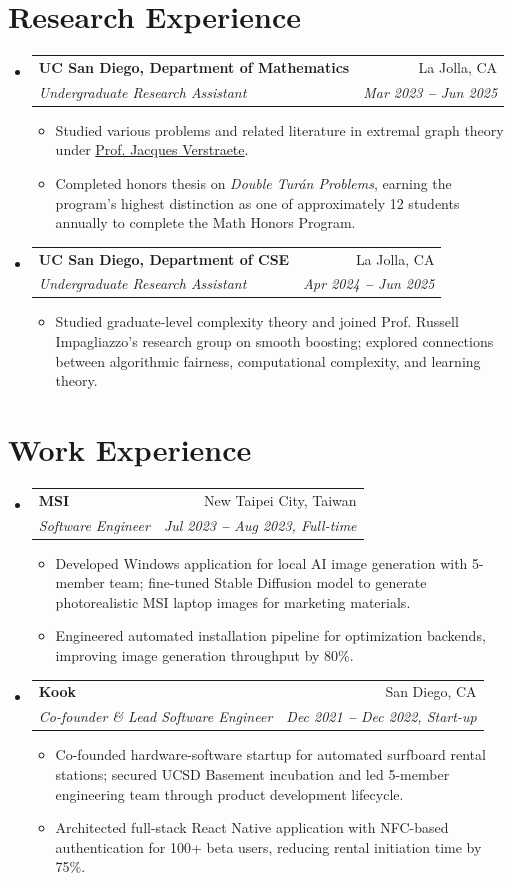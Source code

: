 \documentclass[letterpaper,11pt]{article}
\makeatletter
\newcommand{\resumeItem}[1]{
  \item\small{
    {#1 \vspace{-1pt}}
  }
}
\newcommand{\resumeSubheading}[4]{
  \vspace{-2pt}\item
    \begin{tabular*}{0.97\textwidth}[t]{l@{\extracolsep{\fill}}r}
      \textbf{#1} & #2 \\
      \textit{\small#3} & \textit{\small #4} \\
    \end{tabular*}\vspace{-2pt}
}
\newcommand{\resumeSubHeadingListStart}{\begin{itemize}[leftmargin=0.15in, label={}]}
\newcommand{\resumeSubHeadingListEnd}{\end{itemize}}
\newcommand{\resumeItemListStart}{\begin{itemize}\vspace{-2pt}}
\newcommand{\resumeItemListEnd}{\end{itemize}\vspace{-7pt}}
\makeatother
\begin{document}

\section{Research Experience}
\resumeSubHeadingListStart
  \resumeSubheading
    {UC San Diego, Department of Mathematics}{La Jolla, CA}
    {Undergraduate Research Assistant}{Mar 2023 \textbf{--} Jun 2025}
    \resumeItemListStart
      \resumeItem{Studied various problems and related literature in extremal graph theory under \href{https://annatar0.wixsite.com/website-4}{Prof. Jacques Verstraete}.}
      \resumeItem{Completed honors thesis on \textit{Double Tur\'{a}n Problems}, earning the program's highest distinction as one of approximately 12 students annually to complete the Math Honors Program.}
    \resumeItemListEnd

  \resumeSubheading
    {UC San Diego, Department of CSE}{La Jolla, CA}
    {Undergraduate Research Assistant}{Apr 2024 \textbf{--} Jun 2025}
    \resumeItemListStart
      \resumeItem{Studied graduate-level complexity theory and joined Prof. Russell Impagliazzo's research group on smooth boosting; explored connections between algorithmic fairness, computational complexity, and learning theory.}
    \resumeItemListEnd
\resumeSubHeadingListEnd


\section{Work Experience}
\resumeSubHeadingListStart
  \resumeSubheading
    {MSI}{New Taipei City, Taiwan}
    {Software Engineer}{Jul 2023 \textbf{--} Aug 2023, Full-time}
    \resumeItemListStart
      \resumeItem{Developed Windows application for local AI image generation with 5-member team; fine-tuned Stable Diffusion model to generate photorealistic MSI laptop images for marketing materials.}
      \resumeItem{Engineered automated installation pipeline for optimization backends, improving image generation throughput by 80\%.}
    \resumeItemListEnd

  \resumeSubheading
    {Kook}{San Diego, CA}
    {Co-founder \& Lead Software Engineer}{Dec 2021 \textbf{--} Dec 2022, Start-up}
    \resumeItemListStart
      \resumeItem{Co-founded hardware-software startup for automated surfboard rental stations; secured UCSD Basement incubation and led 5-member engineering team through product development lifecycle.}
      \resumeItem{Architected full-stack React Native application with NFC-based authentication for 100+ beta users, reducing rental initiation time by 75\%.}
    \resumeItemListEnd
\resumeSubHeadingListEnd
\end{document}
